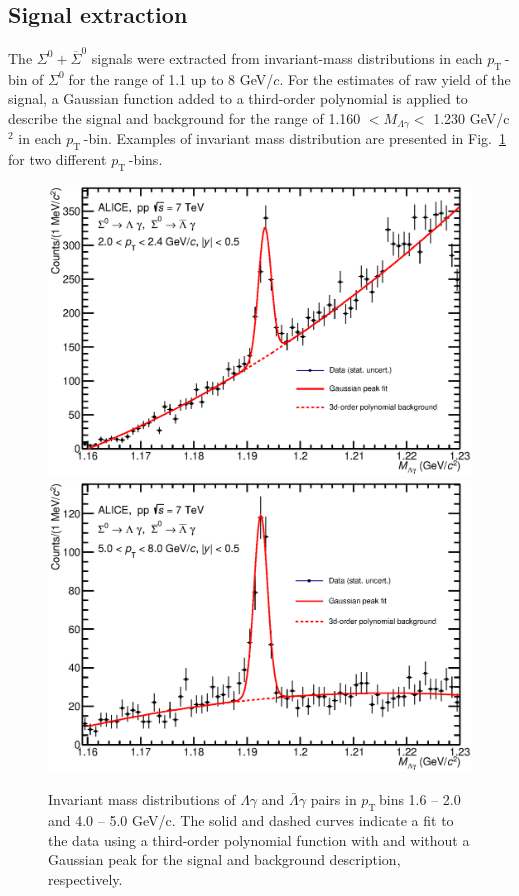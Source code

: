 \documentclass[ALICE,manyauthors]{cernphprep}
\newcommand{\sig}{\ensuremath{\Sigma^0  \; }}
\newcommand{\pt}{\ensuremath{p_{\mathrm{T}\; }}}
\begin{document}
 \subsection{Signal extraction} 
 \label{subsec:signal}

The $\Sigma^{0} + \overline{\Sigma}^{0}$ signals were extracted from invariant-mass 
distributions in each \pt-bin of \sig for the range of 1.1 up to 8 GeV/$c$. For the estimates of raw yield of
the signal, a Gaussian function added to a third-order polynomial is applied to describe the signal and 
background for the range of 1.160 $< M_{\Lambda\gamma}<$ 1.230 GeV/c$^2$ in each \pt-bin. Examples of 
invariant mass distribution are presented in Fig.~\ref{fig:InvMassSigma0} for two different \pt-bins.

\begin{figure}[h!]
\hspace*{-1.0cm}  \includegraphics[width=9.cm]{Figure/10jan18Minvbin3.eps}
\hspace*{-1.0cm}  \includegraphics[width=9.cm]{Figure/10jan18Minvbin8.eps}
\caption{
Invariant mass distributions of $\Lambda\gamma$ and $\bar \Lambda \gamma$ pairs in \pt bins 1.6 -- 2.0 
and 4.0 -- 5.0 GeV/c. The solid and dashed curves indicate a fit to the data using a third-order polynomial 
function with and without a Gaussian peak for the signal and background description, respectively.
}
  \label{fig:InvMassSigma0}
\end{figure}
\end{document}
